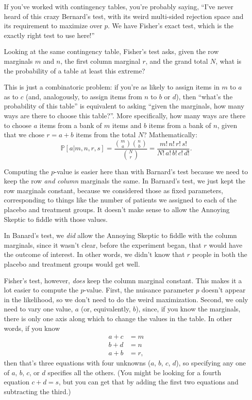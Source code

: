 \documentclass{book}
\begin{document}
If you've worked with contingency tables, you're probably saying, ``I've
never heard of this crazy Bernard's test, with its weird multi-sided
rejection space and its requirement to maximize over \(p\). We have
Fisher's exact test, which is the exactly right test to use here!''

Looking at the same contingency table, Fisher's test asks, given the row
marginals \(m\) and \(n\), the first column marginal \(r\), and the
grand total \(N\), what is the probability of a table at least this
extreme?

This is just a combinatoric problem: if you're as likely to assign items
in \(m\) to \(a\) as to \(c\) (and, analogously, to assign items from
\(n\) to \(b\) or \(d\)), then ``what's the probability of this table''
is equivalent to asking ``given the marginals, how many ways are there
to choose this table?''. More specifically, how many ways are there to
choose \(a\) items from a bank of \(m\) items and \(b\) items from a
bank of \(n\), given that we chose \(r = a + b\) items from the total
\(N\)? Mathematically: \[
\mathbb{P}[a | m, n, r, s] = \frac{\binom{m}{a} \binom{n}{b}}{\binom{N}{r}} = \frac{m! \, n! \, r! \, s!}{N! \, a! \, b! \, c! \, d!}.
\]

Computing the \(p\)-value is easier here than with Barnard's test
because we need to keep the row \emph{and column} marginals the same. In
Barnard's test, we just kept the row marginals constant, because we
considered those as fixed parameters, corresponding to things like the
number of patients we assigned to each of the placebo and treatment
groups. It doesn't make sense to allow the Annoying Skeptic to fiddle
with those values.

In Banard's test, we \emph{did} allow the Annoying Skeptic to fiddle
with the column marginals, since it wasn't clear, before the experiment
began, that \(r\) would have the outcome of interest. In other words, we
didn't know that \(r\) people in both the placebo and treatment groups
would get well.

Fisher's test, however, \emph{does} keep the column marginal constant.
This makes it a lot easier to compute the \(p\)-value. First, the
nuisance parameter \(p\) doesn't appear in the likelihood, so we don't
need to do the weird maximization. Second, we only need to vary one
value, \(a\) (or, equivalently, \(b\)), since, if you know the
marginals, there is only one axis along which to change the values in
the table. In other words, if you know \[
\begin{aligned}
a + c &= m \\
b + d &= n \\
a + b &= r,
\end{aligned}
\] then that's three equations with four unknowns (\(a\), \(b\), \(c\),
\(d\)), so specifying any one of \(a\), \(b\), \(c\), or \(d\) specifies
all the others. (You might be looking for a fourth equation
\(c + d = s\), but you can get that by adding the first two equations
and subtracting the third.)
\end{document}
